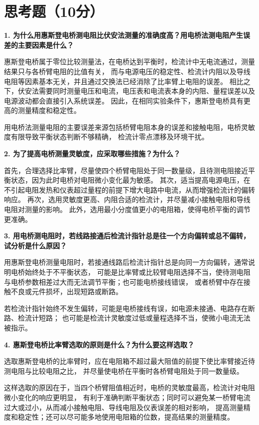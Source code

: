 \documentclass{Phyport}
\begin{document}
\section{思考题（10分）}

\textbf{1. 为什么用惠斯登电桥测电阻比伏安法测量的准确度高？用电桥法测电阻产生误差的主要因素是什么？}

惠斯登电桥属于零位比较测量法，在电桥达到平衡时，检流计中无电流通过，测量结果只与各桥臂电阻的比值有关，
而与电源电压的稳定性、检流计内阻以及导线电阻等因素基本无关，并且通过交换法已经消除了比率臂上电阻的误差。
相比之下，伏安法需要同时测量电压和电流，电压表和电流表本身的内阻、量程误差以及电源波动都会直接引入系统误差。
因此，在相同实验条件下，惠斯登电桥具有更高的测量精度和稳定性。

用电桥法测量电阻的主要误差来源包括桥臂电阻本身的误差和接触电阻，电桥灵敏度有限导致平衡状态判断不够精确，
检流计零点漂移及环境干扰。


\textbf{2. 为了提高电桥测量灵敏度，应采取哪些措施？为什么？}

首先，合理选择比率臂，尽量使四个桥臂电阻处于同一数量级，且待测电阻接近平衡状态，因为此时电桥对电阻微小变化最为敏感。
其次，适当提高电源电压，在不引起电阻发热和仪表超过量程的前提下增大电路中电流，从而增强检流计的偏转响应。
再次，选用灵敏度更高、内阻合适的检流计，并尽量减小接触电阻和导线电阻对测量的影响。
此外，选用最小分度值更小的电阻箱，使得电桥平衡的调节更准确。

\textbf{3. 用电桥测电阻时，若线路接通后检流计指针总是往一个方向偏转或总不偏转，试分析是什么原因？}

用惠斯登电桥测量电阻时，若接通线路后检流计指针总是向同一方向偏转，通常说明电桥始终处于不平衡状态，
可能是比率臂或比较臂电阻选择不当，使待测电阻与电桥参数相差过大而无法调节平衡；也可能电桥接线错误，
或者桥臂中存在接触不良或元件损坏，出现短路或断路。

若检流计指针始终不发生偏转，可能是电桥接线有误，如电源未接通、电路存在断路、检流计短路；
也可能是检流计灵敏度过低或量程选择不当，使微小电流无法被指示。

\textbf{4. 惠斯登电桥比率臂选取的原则是什么？为什么要这样选取？}

选取惠斯登电桥的比率臂时，应在电阻箱不超过最大阻值的前提下使比率臂接近待测电阻与比较电阻之比，
并尽量使电桥在平衡时各桥臂电阻处于同一数量级。

这样选取的原因在于，当四个桥臂阻值相近时，电桥的灵敏度最高，检流计对电阻微小变化的响应更明显，
有利于准确判断平衡状态；同时可以避免某一桥臂电流过大或过小，从而减小接触电阻、导线电阻及仪表误差的相对影响，
提高测量精度和稳定性；还可以尽可能多地使用电阻箱的位数，提高结果的测量精度。
\end{document}
